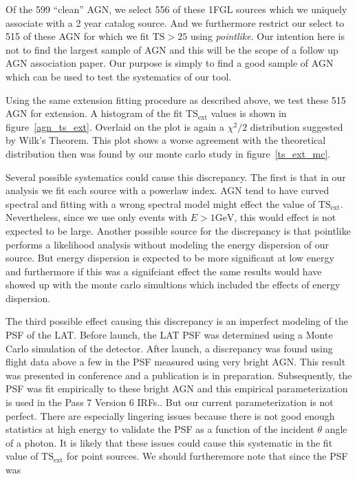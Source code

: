 \documentclass[preprint]{aastex}
\newcommand{\gev}{\text{GeV}\xspace}
\newcommand{\tsext}{\ensuremath{\text{TS}_\text{ext}}\xspace}
\newcommand{\ts}{\text{TS}\xspace}
\newcommand{\pointlike}{{\em pointlike}\xspace}
\begin{document}
Of the 599 ``clean'' AGN, we select 556 of these 1FGL sources which
we uniquely associate with a 2 year catalog source. And we furthermore
restrict our select to 515 of these AGN for which we fit $\ts>25$ using
\pointlike.  Our intention here is not to find the largest sample of
AGN and this will be the scope of a follow up AGN association paper. Our
purpose is simply to find a good sample of AGN which can be used to
test the systematics of our tool.

Using the same extension fitting procedure as described above, we test
these 515 AGN for extension. A histogram of the fit \tsext values is
shown in figure~\ref{agn_ts_ext}. Overlaid on the plot is again
a $\chi^2/2$ distribution suggested by Wilk's Theorem.
This plot shows a worse agreement with the theoretical distribution
then was found by our monte carlo study in figure~\ref{ts_ext_mc}. 

Several possible systematics could cause this discrepancy. The first
is that in our analysis we fit each source with a powerlaw index.
AGN tend to have curved spectral and fitting with a wrong spectral
model might effect the value of \tsext. Nevertheless, since we use only
events with $E>1\gev$, this would effect is not expected to be large.
Another possible source for the discrepancy is that pointlike performs a
likelihood analysis without modeling the energy dispersion of our source.
But energy dispersion is expected to be more significant at low
energy and furthermore if this was a signifciant effect the same results
would have showed up with the monte carlo simultions which included the
effects of energy dispersion. 

The third possible effect causing this discrepancy is an
imperfect modeling of the PSF of the LAT.  Before launch,
the LAT PSF was determined using a Monte Carlo simulation of
the detector.  After launch, a discrepancy was found using flight
data above a few \gev in the PSF measured using very bright AGN.
This result was presented in conference and a publication is in preparation.
Subsequently, the PSF was fit empirically to these bright AGN and
this empirical parameterization is used in the Pass 7 Version 6 IRFs.\cite{
https://confluence.slac.stanford.edu/download/attachments/102860834/FermiSymp2011_CAPSF_v5_ROTH.pptx
}. But our current parameterization is not perfect. There are 
especially lingering issues because there is not good enough statistics
at high energy to validate the PSF as a function of the incident $\theta$
angle of a photon. It is likely that these issues could cause this 
systematic in the fit value of \tsext for point sources. We should
furtheremore note that since the PSF was 
\end{document}

